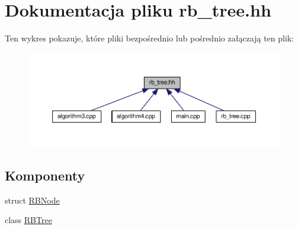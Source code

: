 \hypertarget{rb__tree_8hh}{\section{Dokumentacja pliku rb\-\_\-tree.\-hh}
\label{rb__tree_8hh}
}
Ten wykres pokazuje, które pliki bezpośrednio lub pośrednio załączają ten plik\-:
\nopagebreak
\begin{figure}[H]
\begin{center}
\leavevmode
\includegraphics[width=350pt]{rb__tree_8hh__dep__incl}
\end{center}
\end{figure}
\subsection*{Komponenty}
\begin{DoxyCompactItemize}
\item 
struct \hyperlink{struct_r_b_node}{R\-B\-Node}
\item 
class \hyperlink{class_r_b_tree}{R\-B\-Tree}
\end{DoxyCompactItemize}
